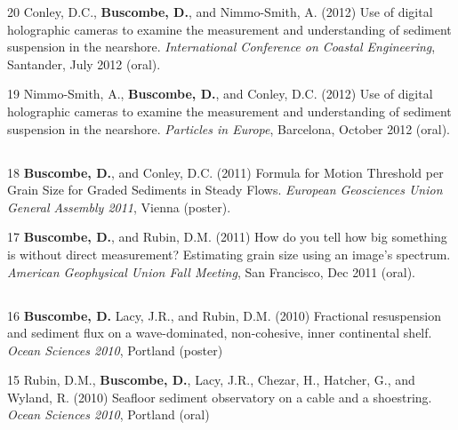 \documentclass[margin,line]{resume}
\begin{document}
\begin{resume}
\begin{footnotesize}
\begin{list1}
	\item[20] Conley, D.C., {\bf Buscombe, D.}, and Nimmo-Smith, A. (2012) Use of digital holographic cameras to examine the measurement and understanding of sediment suspension in the nearshore. {\sl International Conference on Coastal Engineering}, Santander, July 2012 (oral).\\

	\item[19] Nimmo-Smith, A., {\bf Buscombe, D.}, and Conley, D.C. (2012) Use of digital holographic cameras to examine the measurement and understanding of sediment suspension in the nearshore. {\sl Particles in Europe}, Barcelona, October 2012 (oral).
	\end{list1}

	\subsection{}
	\begin{list1}
	\item[18] {\bf Buscombe, D.}, and Conley, D.C. (2011) Formula for Motion Threshold per Grain Size for Graded Sediments in Steady Flows. {\sl European Geosciences Union General Assembly 2011}, Vienna (poster).\\

        \item[17] {\bf Buscombe, D.}, and Rubin, D.M. (2011) How do you tell how big something is without direct measurement? Estimating grain size using an image’s spectrum. {\sl American Geophysical Union Fall Meeting}, San Francisco, Dec 2011 (oral).
	\end{list1}

	\subsection{}
	\begin{list1}
	\item[16] {\bf Buscombe, D.} Lacy, J.R., and Rubin, D.M. (2010) Fractional resuspension and sediment flux on a wave-dominated, non-cohesive, inner continental shelf. {\sl Ocean Sciences 2010}, Portland (poster)\\

	\item[15] Rubin, D.M., {\bf Buscombe, D.}, Lacy, J.R., Chezar, H., Hatcher, G., and Wyland, R. (2010) Seafloor sediment observatory on a cable and a shoestring. {\sl Ocean Sciences 2010}, Portland (oral)\\


\end{list1}
\end{footnotesize}
\end{resume}
\end{document}
